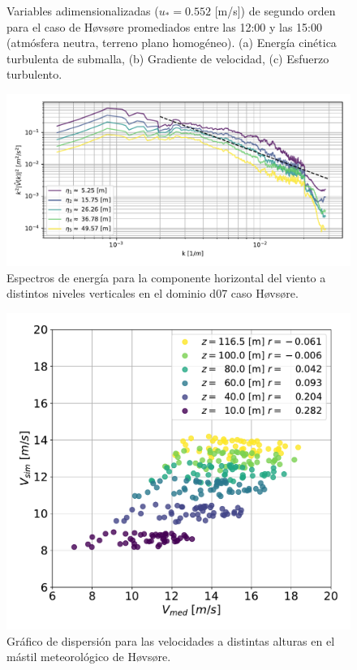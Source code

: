 \begin{figure}[H]
\begin{center}
	\end{center}
	\caption{Variables adimensionalizadas ($u_* = 0.552$ [m/s]) de segundo orden para el caso de Høvsøre promediados entre las 12:00 y las 15:00 (atmósfera neutra, terreno plano homogéneo). (a) Energía cinética turbulenta de submalla, (b) Gradiente de velocidad, (c) Esfuerzo turbulento. }
	\label{fig:06_hov_mean_secondorder}
\end{figure}

\begin{figure}[H]
	\centering
	\includegraphics[width=1.0\linewidth,page=1,trim={3mm 5mm 3mm 3mm},clip]{Imagenes/06/hov/spectra}%
	\caption{Espectros de energía para la componente horizontal del viento a distintos niveles verticales en el dominio d07 caso Høvsøre.}
	\label{fig:06_hov_spectrum}
\end{figure}

\begin{figure}[H]
	\centering
	\includegraphics[width=0.55\linewidth,page=1,trim={0cm 0cm 0cm 0cm},clip]{Imagenes/06/hov/corr}%
	\caption{Gráfico de dispersión para las velocidades a distintas alturas en el mástil meteorológico de Høvsøre.}
	\label{fig:06_corr_hov}
\end{figure}







